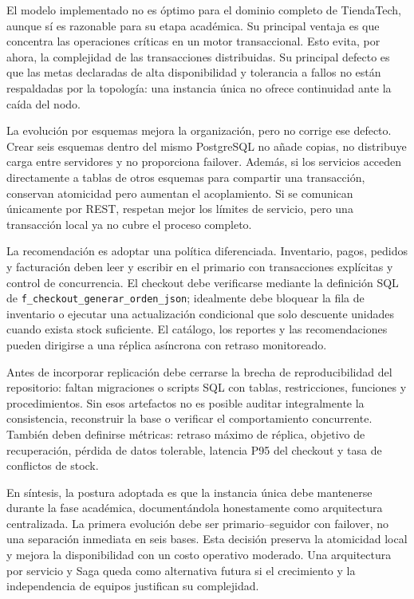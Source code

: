 \documentclass[11pt,a4paper]{article}
\begin{document}
El modelo implementado no es óptimo para el dominio completo de TiendaTech, aunque sí es razonable para su etapa académica. Su principal ventaja es que concentra las operaciones críticas en un motor transaccional. Esto evita, por ahora, la complejidad de las transacciones distribuidas. Su principal defecto es que las metas declaradas de alta disponibilidad y tolerancia a fallos no están respaldadas por la topología: una instancia única no ofrece continuidad ante la caída del nodo.

La evolución por esquemas mejora la organización, pero no corrige ese defecto. Crear seis esquemas dentro del mismo PostgreSQL no añade copias, no distribuye carga entre servidores y no proporciona failover. Además, si los servicios acceden directamente a tablas de otros esquemas para compartir una transacción, conservan atomicidad pero aumentan el acoplamiento. Si se comunican únicamente por REST, respetan mejor los límites de servicio, pero una transacción local ya no cubre el proceso completo.

La recomendación es adoptar una política diferenciada. Inventario, pagos, pedidos y facturación deben leer y escribir en el primario con transacciones explícitas y control de concurrencia. El checkout debe verificarse mediante la definición SQL de \texttt{f\_checkout\_generar\_orden\_json}; idealmente debe bloquear la fila de inventario o ejecutar una actualización condicional que solo descuente unidades cuando exista stock suficiente. El catálogo, los reportes y las recomendaciones pueden dirigirse a una réplica asíncrona con retraso monitoreado.

Antes de incorporar replicación debe cerrarse la brecha de reproducibilidad del repositorio: faltan migraciones o scripts SQL con tablas, restricciones, funciones y procedimientos. Sin esos artefactos no es posible auditar integralmente la consistencia, reconstruir la base o verificar el comportamiento concurrente. También deben definirse métricas: retraso máximo de réplica, objetivo de recuperación, pérdida de datos tolerable, latencia P95 del checkout y tasa de conflictos de stock.

En síntesis, la postura adoptada es que la instancia única debe mantenerse durante la fase académica, documentándola honestamente como arquitectura centralizada. La primera evolución debe ser primario--seguidor con failover, no una separación inmediata en seis bases. Esta decisión preserva la atomicidad local y mejora la disponibilidad con un costo operativo moderado. Una arquitectura por servicio y Saga queda como alternativa futura si el crecimiento y la independencia de equipos justifican su complejidad.
\end{document}

